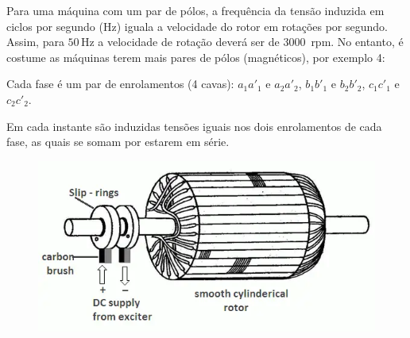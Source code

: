 \noindent Para uma máquina com um par de pólos, a frequência da tensão induzida em ciclos por segundo (Hz) iguala a velocidade do rotor em rotações por segundo. Assim, para $50\,$Hz a velocidade de rotação deverá ser de $3000\,$ rpm. No entanto, é costume as máquinas terem mais pares de pólos (magnéticos), por exemplo 4:

\vspace{1.5em}
\noindent%
\begin{minipage}[c]{.45\linewidth}

    Cada fase é um par de enrolamentos (4 cavas): $a_1 a'_1$ e $a_2 a'_2$, $b_1 b'_1$ e $b_2 b'_2$, $c_1 c'_1$ e $c_2 c'_2$.

    \vspace{1em}
    Em cada instante são induzidas tensões iguais nos dois enrolamentos de cada fase, as quais se somam por estarem em série.

    \begin{figure}[H]
        \centering
        \includegraphics[width=.55\linewidth]{img/3/Synchronous-machine-rotor.png}
    \end{figure}
\end{minipage}\hfill
